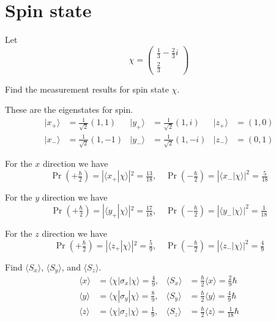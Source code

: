 

\section*{Spin state}

Let
\begin{equation*}
\chi=\begin{pmatrix}\frac{1}{3}-\frac{2}{3}i\\[1ex]\frac{2}{3}\end{pmatrix}
\end{equation*}

Find the measurement results for spin state $\chi$.

\bigskip
These are the eigenstates for spin.
\begin{align*}
|x_+\rangle&=\tfrac{1}{\sqrt2}(1,1) &
|y_+\rangle&=\tfrac{1}{\sqrt2}(1,i) &
|z_+\rangle&=(1,0)
\\
|x_-\rangle&=\tfrac{1}{\sqrt2}(1,-1) &
|y_-\rangle&=\tfrac{1}{\sqrt2}(1,-i) &
|z_-\rangle&=(0,1)
\end{align*}

For the $x$ direction we have
\begin{equation*}
\Pr\left(+\tfrac{\hbar}{2}\right)=|\langle x_+|\chi\rangle|^2=\tfrac{13}{18},\quad
\Pr\left(-\tfrac{\hbar}{2}\right)=|\langle x_-|\chi\rangle|^2=\tfrac{5}{18}
\end{equation*}

For the $y$ direction we have
\begin{equation*}
\Pr\left(+\tfrac{\hbar}{2}\right)=|\langle y_+|\chi\rangle|^2=\tfrac{17}{18},\quad
\Pr\left(-\tfrac{\hbar}{2}\right)=|\langle y_-|\chi\rangle|^2=\tfrac{1}{18}
\end{equation*}

For the $z$ direction we have
\begin{equation*}
\Pr\left(+\tfrac{\hbar}{2}\right)=|\langle z_+|\chi\rangle|^2=\tfrac{5}{9},\quad
\Pr\left(-\tfrac{\hbar}{2}\right)=|\langle z_-|\chi\rangle|^2=\tfrac{4}{9}
\end{equation*}

Find $\langle S_x\rangle$, $\langle S_y\rangle$, and $\langle S_z\rangle$.
\begin{align*}
\langle x\rangle&=\langle\chi|\sigma_x|\chi\rangle=\tfrac{4}{9}, &
\langle S_x\rangle&=\tfrac{\hbar}{2}\langle x\rangle=\tfrac{2}{9}\hbar
\\[1ex]
\langle y\rangle&=\langle\chi|\sigma_y|\chi\rangle=\tfrac{8}{9}, &
\langle S_y\rangle&=\tfrac{\hbar}{2}\langle y\rangle=\tfrac{4}{9}\hbar
\\[1ex]
\langle z\rangle&=\langle\chi|\sigma_z|\chi\rangle=\tfrac{1}{9}, &
\langle S_z\rangle&=\tfrac{\hbar}{2}\langle z\rangle=\tfrac{1}{18}\hbar
\end{align*}


